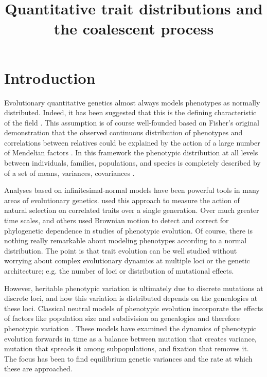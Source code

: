 \documentclass{article}
\begin{document}
\title{Quantitative trait distributions and the coalescent process}
\maketitle

\section{Introduction}
Evolutionary quantitative genetics almost always models phenotypes as normally
distributed. Indeed, it has been suggested that this is the defining
characteristic of the field \citep{Rice2004}. This assumption is of course
well-founded based on Fisher's original demonstration that the observed
continuous distribution of phenotypes and correlations between relatives could
be explained by the action of a large number of Mendelian factors
\citep{Fisher1918}. In this framework the phenotypic distribution at all levels
between individuals, families, populations, and species is completely described
by of a set of means, variances, covariances \citep{Falconer1996}.

Analyses based on infinitesimal-normal models have been powerful tools in many
areas of evolutionary genetics. \citet{Lande1983} used this approach to measure
the action of natural selection on correlated traits over a single generation.
Over much greater time scales, \citet{Freckleton2002} and others used Brownian
motion to detect and correct for phylogenetic dependence in studies of
phenotypic evolution. Of course, there is nothing really remarkable about
modeling phenotypes according to a normal distribution. The point is that trait
evolution can be well studied without worrying about complex evolutionary
dynamics at multiple loci or the genetic architecture; e.g. the number of loci
or distribution of mutational effects.


However, heritable phenotypic variation is ultimately due to discrete mutations
at discrete loci, and how this variation is distributed depends on the
genealogies at these loci. Classical neutral models of phenotypic evolution
incorporate the effects of factors like population size and subdivision on
genealogies and therefore phenotypic variation \citep{Lynch1986,Lande1992}.
These models have examined the dynamics of phenotypic evolution forwards in time
as a balance between mutation that creates variance, mutation that spreads it
among subpopulations, and fixation that removes it. The focus has been to find
equilibrium genetic variances and the rate at which these are approached.
\end{document}
